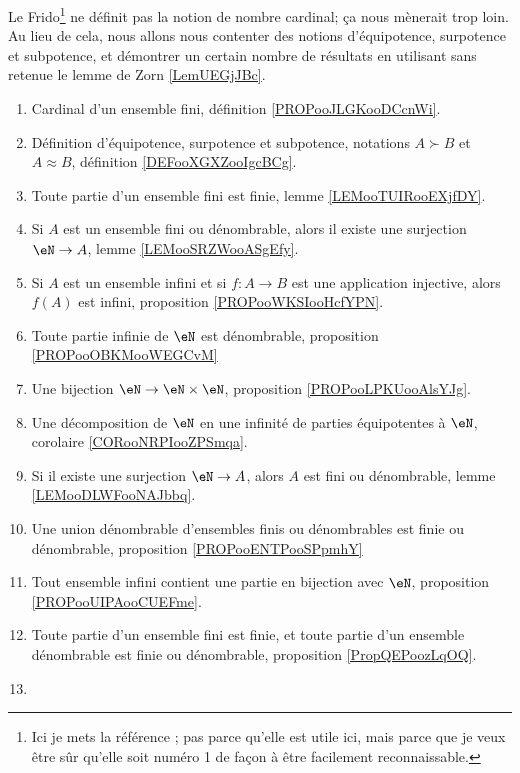 

Le Frido\footnote{Ici je mets la référence \cite{MonCerveau}; pas parce qu'elle est utile ici, mais parce que je veux être sûr qu'elle soit numéro 1 de façon à être facilement reconnaissable.} ne définit pas la notion de nombre cardinal; ça nous mènerait trop loin. Au lieu de cela, nous allons nous contenter des notions d'équipotence, surpotence et subpotence, et démontrer un certain nombre de résultats en utilisant sans retenue le lemme de Zorn \ref{LemUEGjJBc}.
\begin{enumerate}
    \item
        Cardinal d'un ensemble fini, définition \ref{PROPooJLGKooDCcnWi}.
	\item
	      Définition d'équipotence, surpotence et subpotence, notations \( A\succ B\) et \( A\approx B\), définition \ref{DEFooXGXZooIgcBCg}.
	\item
	      Toute partie d'un ensemble fini est finie, lemme \ref{LEMooTUIRooEXjfDY}.
	\item
	      Si \( A\) est un ensemble fini ou dénombrable, alors il existe une surjection \( \eN\to A\), lemme \ref{LEMooSRZWooASgEfy}.
	\item
	      Si \( A\) est un ensemble infini et si \( f\colon A\to B\) est une application injective, alors \( f(A)\) est infini, proposition \ref{PROPooWKSIooHcfYPN}.
	\item
	      Toute partie infinie de \( \eN\) est dénombrable, proposition \ref{PROPooOBKMooWEGCvM}
	\item
	      Une bijection \( \eN\to \eN\times \eN\), proposition \ref{PROPooLPKUooAlsYJg}.
	\item
	      Une décomposition de \( \eN\) en une infinité de parties équipotentes à \( \eN\), corolaire \ref{CORooNRPIooZPSmqa}.
	\item
	      Si il existe une surjection \( \eN\to A\), alors \( A\) est fini ou dénombrable, lemme \ref{LEMooDLWFooNAJbbq}.
	\item
	      Une union dénombrable d'ensembles finis ou dénombrables est finie ou dénombrable, proposition \ref{PROPooENTPooSPpmhY}
	\item
	      Tout ensemble infini contient une partie en bijection avec \( \eN\), proposition \ref{PROPooUIPAooCUEFme}.
	\item
	      Toute partie d'un ensemble fini est finie, et toute partie d'un ensemble dénombrable est finie ou dénombrable, proposition \ref{PropQEPoozLqOQ}.
	\item

\end{enumerate}
